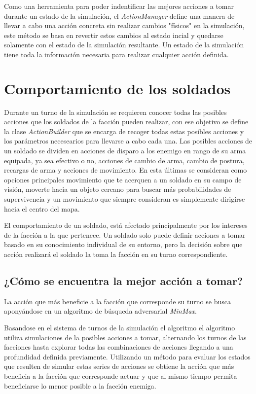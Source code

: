 \documentclass{llncs}
\begin{document}
Como una herramienta para poder indentificar las mejores acciones a tomar durante un estado de la simulaci\'on, el \emph{ActionManager} define una manera de llevar a cabo una acci\'on concreta sin realizar cambios "f\'isicos" en la simulaci\'on, este m\'etodo se basa en revertir estos cambios al estado incial y quedarse solamente con el estado de la simulaci\'on resultante. Un estado de la simulaci\'on tiene toda la informaci\'on necesaria para realizar cualquier acci\'on definida.



\section{Comportamiento de los soldados}

Durante un turno de la simulaci\'on se requieren conocer todas las posibles acciones que los soldados de la facci\'on pueden realizar, con ese objetivo se define la clase \emph{ActionBuilder} que se encarga de recoger todas estas posibles acciones y los par\'ametros necesearios para llevarse a cabo cada una. Las posibles acciones de un soldado se dividen en acciones de disparo a los enemigo en rango de su arma equipada, ya sea efectivo o no, acciones de cambio de arma, cambio de postura, recargas de arma y acciones de movimiento. En esta \'ultimas se consideran como opciones principales movimiento que te acerquen a un soldado en su campo de visi\'on, moverte hacia un objeto cercano para buscar m\'as probabilidades de supervivencia y un movimiento que siempre consideran es simplemente dirigirse hacia el centro del mapa.

El comportamiento de un soldado, est\'a afectado principalmente por los intereses de la facci\'on a la que pertenece. Un soldado solo puede definir acciones a tomar basado en su conocimiento individual de su entorno, pero la decisi\'on sobre que acci\'on realizar\'a el soldado la toma la facci\'on en su turno correspondiente.

\subsection{¿C\'omo se encuentra la mejor acci\'on a tomar?}

La acci\'on que m\'as beneficie a la facci\'on que corresponde su turno se busca apony\'andose en un algoritmo de b\'usqueda adversarial \emph{MinMax}.

Basandose en el sistema de turnos de la simulaci\'on el algoritmo el algoritmo utiliza simulaciones de la posibles acciones a tomar, alternando los turnos de las facciones hasta explorar todas las combinaciones de acciones llegando a una profundidad definida previamente. Utilizando un m\'etodo para evaluar los estados que resulten de simular estas series de acciones se obtiene la acci\'on que m\'as beneficia a la facci\'on que corresponde actuar y que al mismo tiempo permita beneficiarse lo menor posible a la facci\'on enemiga.
\end{document}
